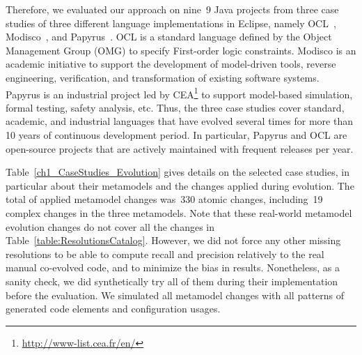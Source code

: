 Therefore, we evaluated our approach on nine~9 Java projects from three case studies of three different language implementations in Eclipse, namely OCL~\cite{MDTOCL}, Modisco~\cite{MDTModisco}, and Papyrus~\cite{MDTPapyrus}. 
%
OCL is a standard language defined by the Object Management Group (OMG) to specify First-order logic constraints. Modisco is an academic initiative to support the development of model-driven tools, reverse engineering, verification, and transformation of existing software systems. 
Papyrus is an industrial project led by CEA\footnote{\url{http://www-list.cea.fr/en/}} to support model-based simulation, formal testing, safety analysis, etc.  
Thus, the three case studies cover standard, academic, and industrial languages that %
%
have evolved several times for more than 10 years of continuous development period. In particular, Papyrus and OCL are open-source projects that are actively maintained with frequent releases per year.
%


Table~\ref{ch1_CaseStudies_Evolution} gives details on the selected case studies, in particular about their metamodels and the changes applied during evolution. The total of applied metamodel changes was~330 atomic changes, including~19 complex changes in the three metamodels. 
Note that these real-world metamodel evolution changes do not cover all the changes in Table~\ref{table:ResolutionsCatalog}. However, we did not force any other missing resolutions to be able to compute recall and precision relatively to the real manual co-evolved code, and to minimize the bias in results. 
Nonetheless, as a sanity check, we did synthetically try all of them during their implementation before the evaluation. We simulated all metamodel changes with all patterns of generated code elements and configuration usages. 


